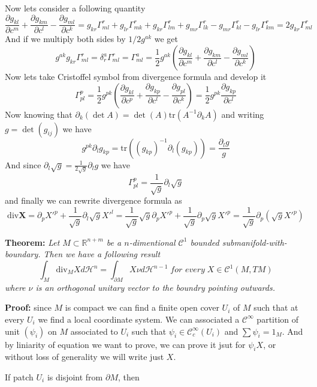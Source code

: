 Now lets consider a following quantity
\[\frac{\partial g_{kl}}{\partial c^m}+\frac{\partial g_{km}}{\partial c^l}-\frac{\partial g_{ml}}{\partial c^k}
=g_{kr}\Gamma^r_{ml}+g_{lr}\Gamma^r_{mk}+g_{kr}\Gamma^r_{lm}+g_{mr}\Gamma^r_{lk}-g_{mr}\Gamma^r_{kl}-g_{lr}\Gamma^r_{km}=2g_{kr}\Gamma^r_{ml}
\]
And if we multiply both sides by $1/2g^{ak}$ we get
\[g^{ak}g_{kr}\Gamma^r_{ml}=\delta_r^a\Gamma^r_{ml}=\Gamma^a_{ml}=\frac{1}{2}g^{ak}(\frac{\partial g_{kl}}{\partial c^m}+\frac{\partial g_{km}}{\partial c^l}-\frac{\partial g_{ml}}{\partial c^k})\]
Now lets take Cristoffel symbol from divergence formula and develop it
\[\Gamma^p_{pl}=\frac{1}{2}g^{pk}(\frac{\partial g_{kl}}{\partial c^p}+\frac{\partial g_{kp}}{\partial c^l}-\frac{\partial g_{pl}}{\partial c^k})
=\frac{1}{2}g^{pk}\frac{\partial g_{kp}}{\partial c^l}\]
Now knowing that $\partial_k(\det A)=\det(A)\text{tr}(A^{-1}\partial_k A)$ and
writing $g=\det(g_{ij})$ we have
\[g^{pk}\partial_l g_{kp}=\text{tr}((g_{kp})^{-1}\partial_l(g_{kp}))=\frac{\partial_l g}{g}\]
And since $\partial_l\sqrt g=\frac{1}{2\sqrt g}\partial_l g$ we have
\[\Gamma^p_{pl}=\frac{1}{\sqrt g}\partial_l\sqrt g\]
and finally we can rewrite divergence formula as
\[\text{div}\mathbf X=\partial_p X'^p+\frac{1}{\sqrt g}\partial_l\sqrt g X'^l
=\frac{1}{\sqrt g}\sqrt g\partial_p X'^p+\frac{1}{\sqrt g}\partial_p\sqrt g X'^p
=\frac{1}{\sqrt g}\partial_p(\sqrt g X'^p)
\]

\vspace{2ex}
\textbf{Theorem:} \textit{Let $M\subset \mathbb R^{n+m}$ be a $n$-dimentional
$\mathcal C^1$ bounded submanifold-with-boundary. Then we have a following result}
\[\int_M \text{div}_MXd\mathcal H^n=\int_{\partial M}X\nu d\mathcal H^{n-1}\;\textit{for every}\;X\in\mathcal C^1(M,TM)\]
\textit{where $\nu$ is an orthogonal unitary vector to the boundry pointing outwards.}

\vspace{1ex}
\textbf{Proof:} since $M$ is compact we can find a finite open cover $U_i$ of
$M$ such that at every $U_i$ we find a local coordinate system. We can associated
a $\mathcal C^\infty$ partition of unit $(\psi_i)$ on $M$ associated to $U_i$ such
that $\psi_i\in\mathcal C^\infty_c(U_i)$ and $\sum\psi_i=1_M$. And by liniarity
of equation we want to prove, we can prove it jsut for $\psi_iX$, or without
loss of generality we will write just $X$.

\vspace{1ex} If patch $U_i$ is disjoint from $\partial M$, then 

